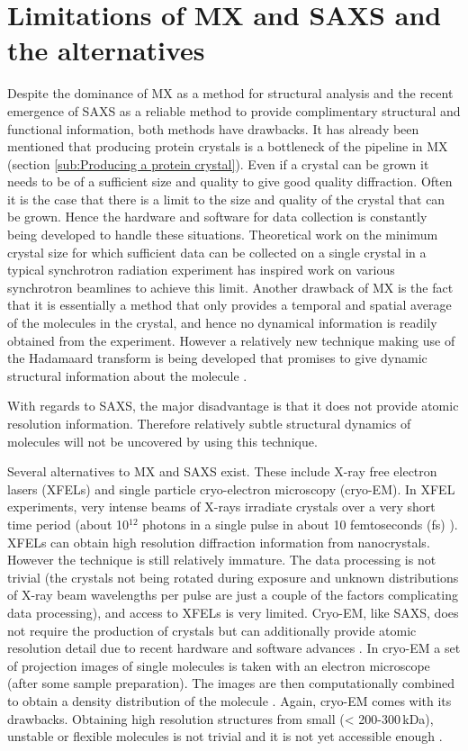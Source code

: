 \section{Limitations of MX and SAXS and the alternatives}
\label{sec:Limitations and alternatives to MX and SAXS}
    Despite the dominance of MX as a method for structural analysis and the recent emergence of SAXS as a reliable method to provide complimentary structural and functional information, both methods have drawbacks.
    It has already been mentioned that producing protein crystals is a bottleneck of the pipeline in MX (section \ref{sub:Producing a protein crystal}).
    Even if a crystal can be grown it needs to be of a sufficient size and quality to give good quality diffraction.
    Often it is the case that there is a limit to the size and quality of the crystal that can be grown.
    Hence the hardware and software for data collection is constantly being developed to handle these situations.
    Theoretical work on the minimum crystal size for which sufficient data can be collected on a single crystal in a typical synchrotron radiation experiment \cite{holton2010} has inspired work on various synchrotron beamlines to achieve this limit.
    Another drawback of MX is the fact that it is essentially a method that only provides a temporal and spatial average of the molecules in the crystal, and hence no dynamical information is readily obtained from the experiment.
    However a relatively new technique making use of the Hadamaard transform is being developed that promises to give dynamic structural information about the molecule \cite{yorke2014time}.

    With regards to SAXS, the major disadvantage is that it does not provide atomic resolution information. Therefore relatively subtle structural dynamics of molecules will not be uncovered by using this technique.

    Several alternatives to MX and SAXS exist. These include X-ray free electron lasers (XFELs) and single particle cryo-electron microscopy (cryo-EM).
    In XFEL experiments, very intense beams of X-rays irradiate crystals over a very short time period (about 10$^{\text{12}}$ photons in a single pulse in about 10 femtoseconds (fs) \cite{chapman2011femtosecond}). XFELs can obtain high resolution diffraction information from nanocrystals.
    However the technique is still relatively immature.
    The data processing is not trivial (the crystals not being rotated during exposure and unknown distributions of X-ray beam wavelengths per pulse are just a couple of the factors complicating data processing), and access to XFELs is very limited.
    Cryo-EM, like SAXS, does not require the production of crystals but can additionally provide atomic resolution detail due to recent hardware and software advances \cite{bai2015cryo}.
    In cryo-EM a set of projection images of single molecules is taken with an electron microscope (after some sample preparation).
    The images are then computationally combined to obtain a density distribution of the molecule \cite{milne2013cryo}.
    Again, cryo-EM comes with its drawbacks. Obtaining high resolution structures from small (< 200-300$\,$kDa), unstable or flexible molecules is not trivial and it is not yet accessible enough \cite{bai2015cryo}.
